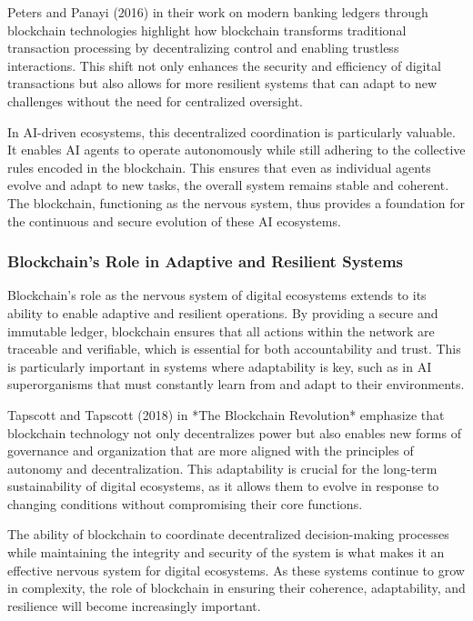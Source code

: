 \documentclass[12pt,twoside]{article}
\begin{document}
Peters and Panayi (2016) in their work on modern banking ledgers through blockchain technologies highlight how blockchain transforms traditional transaction processing by decentralizing control and enabling trustless interactions. This shift not only enhances the security and efficiency of digital transactions but also allows for more resilient systems that can adapt to new challenges without the need for centralized oversight.

In AI-driven ecosystems, this decentralized coordination is particularly valuable. It enables AI agents to operate autonomously while still adhering to the collective rules encoded in the blockchain. This ensures that even as individual agents evolve and adapt to new tasks, the overall system remains stable and coherent. The blockchain, functioning as the nervous system, thus provides a foundation for the continuous and secure evolution of these AI ecosystems.

\subsubsection{Blockchain's Role in Adaptive and Resilient Systems}

Blockchain’s role as the nervous system of digital ecosystems extends to its ability to enable adaptive and resilient operations. By providing a secure and immutable ledger, blockchain ensures that all actions within the network are traceable and verifiable, which is essential for both accountability and trust. This is particularly important in systems where adaptability is key, such as in AI superorganisms that must constantly learn from and adapt to their environments.

Tapscott and Tapscott (2018) in *The Blockchain Revolution* emphasize that blockchain technology not only decentralizes power but also enables new forms of governance and organization that are more aligned with the principles of autonomy and decentralization. This adaptability is crucial for the long-term sustainability of digital ecosystems, as it allows them to evolve in response to changing conditions without compromising their core functions.

The ability of blockchain to coordinate decentralized decision-making processes while maintaining the integrity and security of the system is what makes it an effective nervous system for digital ecosystems. As these systems continue to grow in complexity, the role of blockchain in ensuring their coherence, adaptability, and resilience will become increasingly important.
\end{document}
